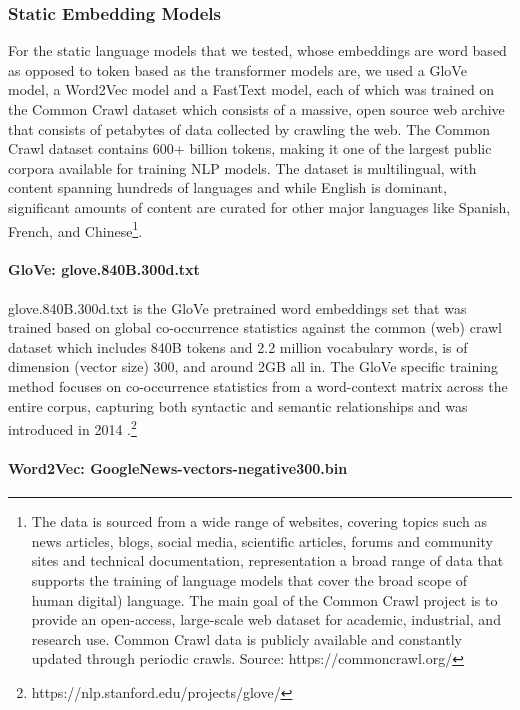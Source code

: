 \documentclass[final]{clv2025}
\begin{document}
\subsubsection{Static Embedding Models}
For the static language models that we tested, whose embeddings are word based as opposed to token based as the transformer models are, we used a GloVe model, a Word2Vec model and a FastText model, each of which was trained on the Common Crawl dataset which consists of a massive, open source web archive that consists of petabytes of data collected by crawling the web. The Common Crawl dataset contains 600+ billion tokens, making it one of the largest public corpora available for training NLP models. The dataset is multilingual, with content spanning hundreds of languages and while English is dominant, significant amounts of content are curated for other major languages like Spanish, French, and Chinese\footnote{The data is sourced from a wide range of websites, covering topics such as news articles, blogs, social media, scientific articles, forums and community sites and technical documentation, representation a broad range of data that supports the training of language models that cover the broad scope of human digital) language. The main goal of the Common Crawl project is to provide an open-access, large-scale web dataset for academic, industrial, and research use. Common Crawl data is publicly available and constantly updated through periodic crawls. Source: https://commoncrawl.org/}. 

\paragraph{GloVe: glove.840B.300d.txt} 

glove.840B.300d.txt is the GloVe pretrained word embeddings set that was trained based on global co-occurrence statistics against the common (web) crawl dataset which includes 840B tokens and 2.2 million vocabulary words, is of dimension (vector size) 300, and around 2GB all in. The GloVe specific training method focuses on co-occurrence statistics from a word-context matrix across the entire corpus, capturing both syntactic and semantic relationships and was introduced in 2014 \cite{pennington}.\footnote{  https://nlp.stanford.edu/projects/glove/} 

\paragraph{Word2Vec: GoogleNews-vectors-negative300.bin}
\end{document}
